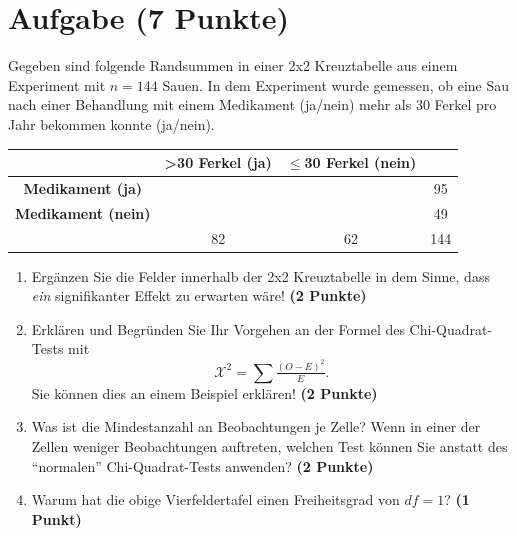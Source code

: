 \documentclass[a4paper, 10pt]{scrartcl}\usepackage[]{graphicx}\usepackage[]{xcolor}
\begin{document}
\section{Aufgabe \hfill (7 Punkte)}



Gegeben sind folgende Randsummen in einer 2x2 Kreuztabelle aus einem
Experiment mit $n = 144$ Sauen. In dem Experiment wurde gemessen,
ob eine Sau nach einer Behandlung mit einem Medikament (ja/nein)
mehr als 30 Ferkel pro Jahr bekommen konnte (ja/nein).

\vspace{5Ex}

\begin{center}
  \Large
  \begin{tabular}{c|c|c|c}
     & \textbf{>30 Ferkel (ja)} & \textbf{$\leq$30 Ferkel (nein)} &  \strut\\
    \hline
    \textbf{Medikament (ja)} & \phantom{100}  & \phantom{100}  &   95  \strut\\
    \hline
    \textbf{Medikament (nein)} & \phantom{100}  & \phantom{100}  &   49   \strut\\
    \hline
     &  82 &  62 &  144  \strut\\
  \end{tabular}
\end{center}



\vspace{5Ex}

\begin{enumerate}
\item Erg{\"a}nzen Sie die Felder innerhalb der 2x2 Kreuztabelle in dem Sinne,
  dass \textit{ein} signifikanter Effekt zu erwarten w{\"a}re!
  \textbf{(2 Punkte)}
\item Erkl{\"a}ren und Begr{\"u}nden Sie Ihr Vorgehen an der Formel des
  Chi-Quadrat-Tests mit
  \begin{equation*}
  \mathcal{X}^2 = \sum\tfrac{(O - E)^2}{E}.  
  \end{equation*}
  Sie k{\"o}nnen dies an einem Beispiel erkl{\"a}ren! \textbf{(2 Punkte)}
\item Was ist die Mindestanzahl an Beobachtungen je Zelle? Wenn in einer
  der Zellen weniger Beobachtungen auftreten, welchen Test k{\"o}nnen Sie
  anstatt des "`normalen"' Chi-Quadrat-Tests anwenden? \textbf{(2 Punkte)}
\item Warum hat die obige Vierfeldertafel einen Freiheitsgrad von $df=1$?
  \textbf{(1 Punkt)}
\end{enumerate} 
\clearpage
\end{document}

